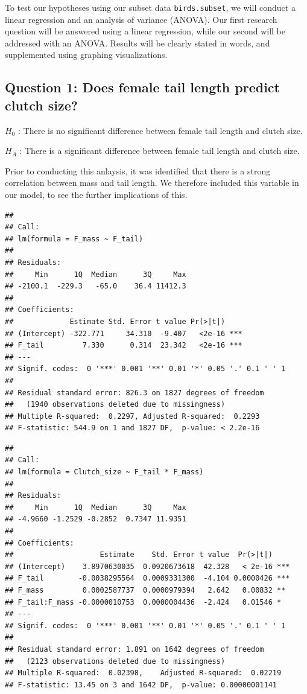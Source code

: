 \documentclass[
  12pt,
]{article}
\begin{document}
To test our hypotheses using our subset data \texttt{birds.subset}, we
will conduct a linear regression and an analysis of variance (ANOVA).
Our first research question will be answered using a linear regression,
while our second will be addressed with an ANOVA. Results will be
clearly stated in words, and supplemented using graphing visualizations.

\hypertarget{question-1-does-female-tail-length-predict-clutch-size}{%
\subsection{Question 1: Does female tail length predict clutch
size?}\label{question-1-does-female-tail-length-predict-clutch-size}}

\(H_0\) : There is no significant difference between female tail length
and clutch size.

\(H_A\) : There is a significant difference between female tail length
and clutch size.

Prior to conducting this anlaysis, it was identified that there is a
strong correlation between mass and tail length. We therefore included
this variable in our model, to see the further implications of this.

\begin{verbatim}
## 
## Call:
## lm(formula = F_mass ~ F_tail)
## 
## Residuals:
##     Min      1Q  Median      3Q     Max 
## -2100.1  -229.3   -65.0    36.4 11412.3 
## 
## Coefficients:
##             Estimate Std. Error t value Pr(>|t|)    
## (Intercept) -322.771     34.310  -9.407   <2e-16 ***
## F_tail         7.330      0.314  23.342   <2e-16 ***
## ---
## Signif. codes:  0 '***' 0.001 '**' 0.01 '*' 0.05 '.' 0.1 ' ' 1
## 
## Residual standard error: 826.3 on 1827 degrees of freedom
##   (1940 observations deleted due to missingness)
## Multiple R-squared:  0.2297, Adjusted R-squared:  0.2293 
## F-statistic: 544.9 on 1 and 1827 DF,  p-value: < 2.2e-16
\end{verbatim}

\begin{verbatim}
## 
## Call:
## lm(formula = Clutch_size ~ F_tail * F_mass)
## 
## Residuals:
##     Min      1Q  Median      3Q     Max 
## -4.9660 -1.2529 -0.2852  0.7347 11.9351 
## 
## Coefficients:
##                    Estimate    Std. Error t value  Pr(>|t|)    
## (Intercept)    3.8970630035  0.0920673618  42.328   < 2e-16 ***
## F_tail        -0.0038295564  0.0009331300  -4.104 0.0000426 ***
## F_mass         0.0002587737  0.0000979394   2.642   0.00832 ** 
## F_tail:F_mass -0.0000010753  0.0000004436  -2.424   0.01546 *  
## ---
## Signif. codes:  0 '***' 0.001 '**' 0.01 '*' 0.05 '.' 0.1 ' ' 1
## 
## Residual standard error: 1.891 on 1642 degrees of freedom
##   (2123 observations deleted due to missingness)
## Multiple R-squared:  0.02398,    Adjusted R-squared:  0.02219 
## F-statistic: 13.45 on 3 and 1642 DF,  p-value: 0.00000001141
\end{verbatim}
\end{document}
